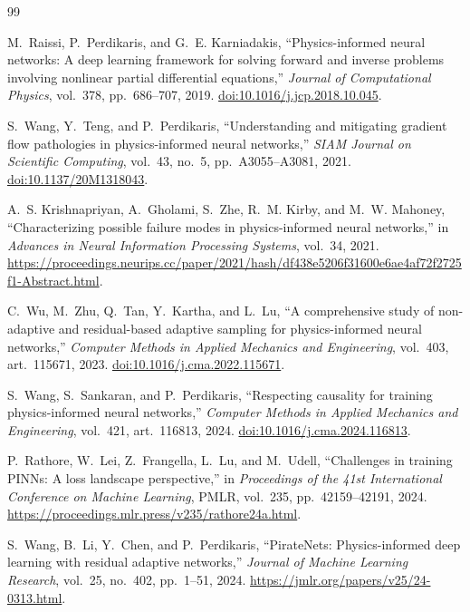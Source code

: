 \documentclass[11pt]{article}
\begin{document}
\begin{thebibliography}{99}

M.~Raissi, P.~Perdikaris, and G.~E. Karniadakis,
``Physics-informed neural networks: A deep learning framework for solving
forward and inverse problems involving nonlinear partial differential
equations,'' \emph{Journal of Computational Physics}, vol.~378, pp.~686--707,
2019. \href{https://doi.org/10.1016/j.jcp.2018.10.045}{doi:10.1016/j.jcp.2018.10.045}.

S.~Wang, Y.~Teng, and P.~Perdikaris,
``Understanding and mitigating gradient flow pathologies in physics-informed
neural networks,'' \emph{SIAM Journal on Scientific Computing}, vol.~43,
no.~5, pp.~A3055--A3081, 2021.
\href{https://doi.org/10.1137/20M1318043}{doi:10.1137/20M1318043}.

A.~S. Krishnapriyan, A.~Gholami, S.~Zhe, R.~M. Kirby, and M.~W. Mahoney,
``Characterizing possible failure modes in physics-informed neural networks,''
in \emph{Advances in Neural Information Processing Systems}, vol.~34, 2021.
\url{https://proceedings.neurips.cc/paper/2021/hash/df438e5206f31600e6ae4af72f2725f1-Abstract.html}.

C.~Wu, M.~Zhu, Q.~Tan, Y.~Kartha, and L.~Lu,
``A comprehensive study of non-adaptive and residual-based adaptive sampling
for physics-informed neural networks,'' \emph{Computer Methods in Applied
Mechanics and Engineering}, vol.~403, art.~115671, 2023.
\href{https://doi.org/10.1016/j.cma.2022.115671}{doi:10.1016/j.cma.2022.115671}.

S.~Wang, S.~Sankaran, and P.~Perdikaris,
``Respecting causality for training physics-informed neural networks,''
\emph{Computer Methods in Applied Mechanics and Engineering}, vol.~421,
art.~116813, 2024.
\href{https://doi.org/10.1016/j.cma.2024.116813}{doi:10.1016/j.cma.2024.116813}.

P.~Rathore, W.~Lei, Z.~Frangella, L.~Lu, and M.~Udell,
``Challenges in training PINNs: A loss landscape perspective,'' in
\emph{Proceedings of the 41st International Conference on Machine Learning},
PMLR, vol.~235, pp.~42159--42191, 2024.
\url{https://proceedings.mlr.press/v235/rathore24a.html}.

S.~Wang, B.~Li, Y.~Chen, and P.~Perdikaris,
``PirateNets: Physics-informed deep learning with residual adaptive networks,''
\emph{Journal of Machine Learning Research}, vol.~25, no.~402, pp.~1--51,
2024. \url{https://jmlr.org/papers/v25/24-0313.html}.


\end{thebibliography}
\end{document}
